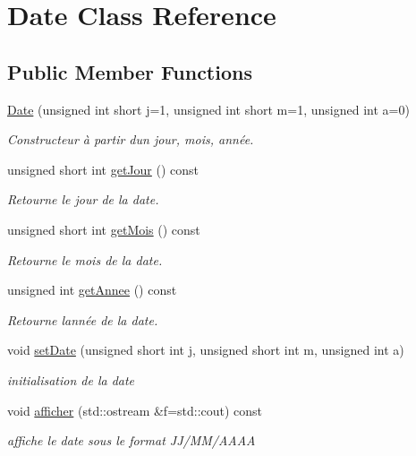 \hypertarget{class_date}{}\section{Date Class Reference}
\label{class_date}
\subsection*{Public Member Functions}
\begin{DoxyCompactItemize}
\item 
\hyperlink{class_date_afbee955665b0aeb1a62764c0984628ca}{Date} (unsigned int short j=1, unsigned int short m=1, unsigned int a=0)
\begin{DoxyCompactList}\small\item\em Constructeur à partir d\textquotesingle{}un jour, mois, année. \end{DoxyCompactList}\item 
unsigned short int \hyperlink{class_date_af62b5126cdc9296302151791b333c8c5}{get\+Jour} () const
\begin{DoxyCompactList}\small\item\em Retourne le jour de la date. \end{DoxyCompactList}\item 
unsigned short int \hyperlink{class_date_a42e4cba117fe2bf546509313cba561c8}{get\+Mois} () const
\begin{DoxyCompactList}\small\item\em Retourne le mois de la date. \end{DoxyCompactList}\item 
unsigned int \hyperlink{class_date_aa0da782e7848c098e8bff1b6ecbf6880}{get\+Annee} () const
\begin{DoxyCompactList}\small\item\em Retourne l\textquotesingle{}année de la date. \end{DoxyCompactList}\item 
void \hyperlink{class_date_a7419902750e61b9473ab05ccd5ced33d}{set\+Date} (unsigned short int j, unsigned short int m, unsigned int a)
\begin{DoxyCompactList}\small\item\em initialisation de la date \end{DoxyCompactList}\item 
void \hyperlink{class_date_aa1d8af4081975eb4a323afd962a25fd7}{afficher} (std\+::ostream \&f=std\+::cout) const
\begin{DoxyCompactList}\small\item\em affiche le date sous le format J\+J/\+M\+M/\+A\+A\+AA \end{DoxyCompactList}\item 

\end{DoxyCompactItemize}
